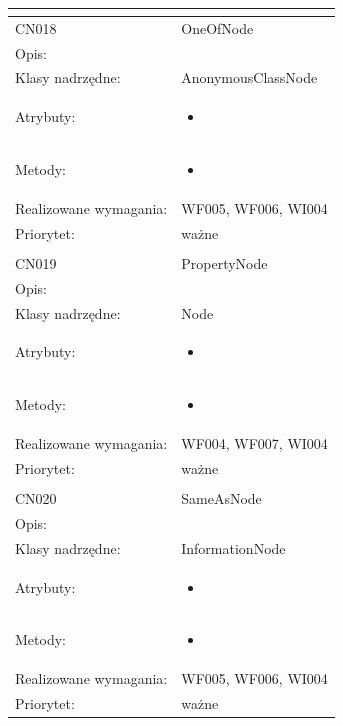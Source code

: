 \documentclass[a4paper,10pt]{article}
\begin{document}
\begin{center}
\begin{longtable}{|m{3cm}|m{9cm}|}
\multicolumn{2}{c}{} \\
 \hline

CN018 & OneOfNode \\ \hline
Opis: &     \\ \hline
Klasy nadrzędne: & AnonymousClassNode     \\ \hline
Atrybuty: & \begin{itemize}
 \item 
\end{itemize}
 \\ \hline
Metody: & \begin{itemize}
 \item 
\end{itemize}
  \\ \hline
Realizowane wymagania: & WF005, WF006, WI004 \\ \hline
Priorytet: & ważne  \\ \hline

\multicolumn{2}{c}{} \\
 \hline

CN019 & PropertyNode \\ \hline
Opis: &     \\ \hline
Klasy nadrzędne: & Node     \\ \hline
Atrybuty: & \begin{itemize}
 \item 
\end{itemize}
 \\ \hline
Metody: & \begin{itemize}
 \item 
\end{itemize}
  \\ \hline
Realizowane wymagania: & WF004, WF007, WI004 \\ \hline
Priorytet: & ważne  \\ \hline

\multicolumn{2}{c}{} \\
 \hline

CN020 & SameAsNode \\ \hline
Opis: &     \\ \hline
Klasy nadrzędne: & InformationNode     \\ \hline
Atrybuty: & \begin{itemize}
 \item 
\end{itemize}
 \\ \hline
Metody: & \begin{itemize}
 \item 
\end{itemize}
  \\ \hline
Realizowane wymagania: & WF005, WF006, WI004 \\ \hline
Priorytet: & ważne  \\ \hline


\end{longtable}
\end{center}
\end{document}
